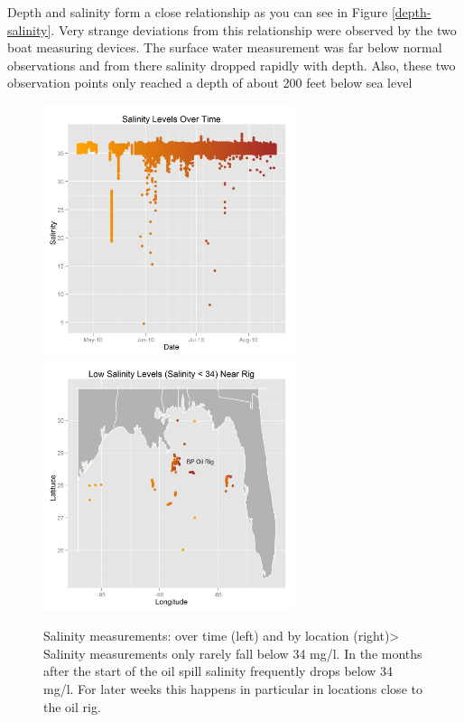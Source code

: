 \documentclass[11pt]{article}
\begin{document}
Depth and salinity form a close relationship as you can see in Figure \ref {depth-salinity}.  Very strange deviations from this relationship were observed by the two boat measuring devices. The surface water measurement was far below normal observations and from there salinity dropped rapidly with depth.  Also, these two observation points only reached a depth of about 200 feet below sea level


\begin{figure}[htbp] %
   \centering
   \includegraphics[width=2.9in]{salinity-time.png} 
   \includegraphics[width=2.9in]{salinity-map.png} 
   \caption{Salinity measurements: over time (left) and by location (right)> Salinity measurements only rarely fall below 34 mg/l. In the months after the start of the oil spill salinity frequently drops below 34 mg/l. For later weeks this happens in particular in locations close to the oil rig.}
   \label{salinity-timeline}
\end{figure}
\end{document}
